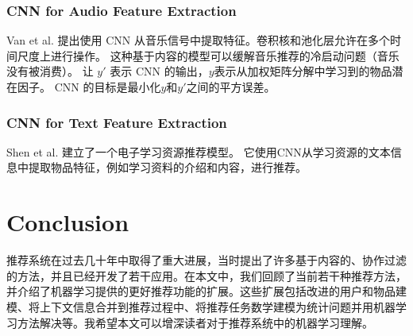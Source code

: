 \documentclass[sigconf]{acmart}
\begin{document}
\subsubsection{CNN for Audio Feature Extraction} 

Van et al. \cite{van2013deep} 提出使用 CNN 从音乐信号中提取特征。卷积核和池化层允许在多个时间尺度上进行操作。 这种基于内容的模型可以缓解音乐推荐的冷启动问题（音乐没有被消费）。 让 $y'$ 表示 CNN 的输出，$y$表示从加权矩阵分解中学习到的物品潜在因子。 CNN 的目标是最小化$y$和$y'$之间的平方误差。 

\subsubsection{CNN for Text Feature Extraction} 

Shen et al. \cite{shen2016automatic} 建立了一个电子学习资源推荐模型。 它使用CNN从学习资源的文本信息中提取物品特征，例如学习资料的介绍和内容，进行推荐。

\section{Conclusion}

推荐系统在过去几十年中取得了重大进展，当时提出了许多基于内容的、协作过滤的方法，并且已经开发了若干应用。在本文中，我们回顾了当前若干种推荐方法，并介绍了机器学习提供的更好推荐功能的扩展。这些扩展包括改进的用户和物品建模、将上下文信息合并到推荐过程中、将推荐任务数学建模为统计问题并用机器学习方法解决等。我希望本文可以增深读者对于推荐系统中的机器学习理解。



  
\end{document}
